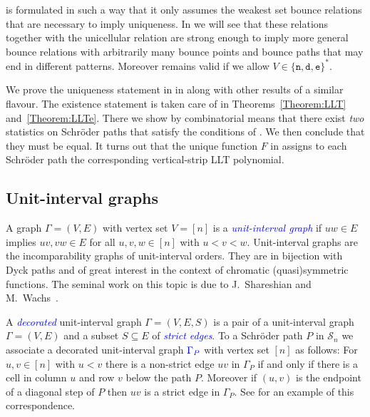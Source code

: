 \documentclass[reqno]{amsart}
\newcommand{\abs}[1]{\left| #1 \right|}
\newcommand{\defin}[1]{\textcolor{blue}{\emph{#1}}}
\newcommand{\mathdefin}[1]{\textcolor{blue}{#1}}
\newcommand{\estep}{\texttt{e}}
\newcommand{\dstep}{\texttt{d}}
\newcommand{\nstep}{\texttt{n}}
\newcommand{\edge}[2]{{#1#2}}
\DeclareMathOperator{\area}{area}
\newcommand{\elementaryE}{\mathrm{e}}
\newcommand{\uig}{\Gamma}			%
\newcommand{\SCH}[1]{\mathcal{S}_{#1}}     %
\begin{document}
 is formulated in such a way that it only assumes the weakest set 
bounce relations that are necessary to imply uniqueness.
In  we will see that these relations together with the 
unicellular relation are strong enough to imply more general bounce 
relations with arbitrarily many bounce points and bounce paths that may end in different patterns.
Moreover  remains valid if we allow $V\in\{\nstep,\dstep,\estep\}^*$.

We prove the uniqueness statement in  in  along with other results of a similar flavour.
The existence statement is taken care of in Theorems~\ref{Theorem:LLT} and~\ref{Theorem:LLTe}.
There we show 
by combinatorial means that there exist \emph{two} statistics on Schr{\"o}der 
paths that satisfy the conditions of .
We then conclude that they must be equal.
It turns out that the unique function $F$ in  assigns to 
each Schr{\"o}der path the corresponding vertical-strip LLT polynomial.











\subsection{Unit-interval graphs}
A graph $\Gamma=(V,E)$ with vertex set $V=[n]$ is a \defin{unit-interval graph} 
if $\edge{u}{w}\in E$ implies $\edge{u}{v},\edge{v}{w}\in E$ for all $u,v,w\in[n]$ with $u<v<w$.
Unit-interval graphs are the incomparability graphs of unit-interval orders.
They are in bijection with Dyck paths and of 
great interest in the context of chromatic (quasi)symmetric functions.
The seminal work on this topic is due to J.~Shareshian and M.~Wachs~\cite{ShareshianWachs2012,ShareshianWachs2016}.


A \defin{decorated} unit-interval graph $\Gamma=(V,E,S)$ is a pair of 
a unit-interval graph $\Gamma=(V,E)$ and a subset $S\subseteq E$ of \defin{strict edges}.
To a Schr{\"o}der path $P$ in $\SCH{n}$ we associate a decorated unit-interval graph $\mathdefin{\Gamma_P}$ with vertex set $[n]$ as follows:
For $u,v\in[n]$ with $u<v$ there is a non-strict edge $\edge{u}{v}$ in $\Gamma_P$ if and only if there is a cell in column $u$ and row $v$ below the path $P$.
Moreover if $(u,v)$ is the endpoint of a diagonal step of $P$ then $\edge{u}{v}$ is a strict edge in $\Gamma_P$.
See  for an example of this correspondence.
\end{document}
